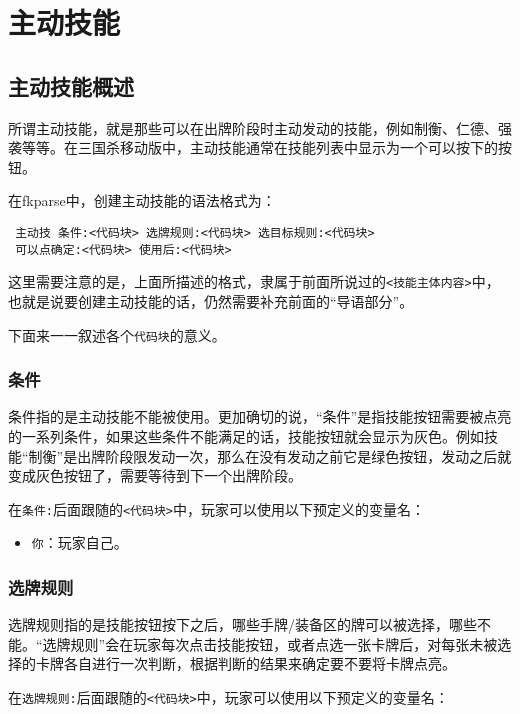 \chapter{主动技能}

\section{主动技能概述}

所谓主动技能，就是那些可以在出牌阶段时主动发动的技能，例如制衡、仁德、强袭等等。在三国杀移动版中，主动技能通常在技能列表中显示为一个可以按下的按钮。

在fkparse中，创建主动技能的语法格式为：

\begin{verbatim}
 主动技 条件:<代码块> 选牌规则:<代码块> 选目标规则:<代码块>
 可以点确定:<代码块> 使用后:<代码块>
\end{verbatim}

这里需要注意的是，上面所描述的格式，隶属于前面所说过的\verb|<技能主体内容>|中，也就是说要创建主动技能的话，仍然需要补充前面的“导语部分”。

下面来一一叙述各个\verb|代码块|的意义。

\subsection{条件}

条件指的是主动技能不能被使用。更加确切的说，“条件”是指技能按钮需要被点亮的一系列条件，如果这些条件不能满足的话，技能按钮就会显示为灰色。例如技能“制衡”是出牌阶段限发动一次，那么在没有发动之前它是绿色按钮，发动之后就变成灰色按钮了，需要等待到下一个出牌阶段。

在\verb|条件:|后面跟随的\verb|<代码块>|中，玩家可以使用以下预定义的变量名：

\begin{itemize}
 \item \verb|你|：玩家自己。
\end{itemize}

\subsection{选牌规则}

选牌规则指的是技能按钮按下之后，哪些手牌/装备区的牌可以被选择，哪些不能。“选牌规则”会在玩家每次点击技能按钮，或者点选一张卡牌后，对每张未被选择的卡牌各自进行一次判断，根据判断的结果来确定要不要将卡牌点亮。

在\verb|选牌规则:|后面跟随的\verb|<代码块>|中，玩家可以使用以下预定义的变量名：

